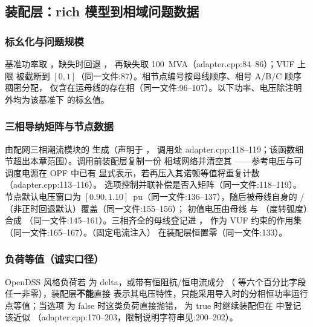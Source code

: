 \subsection{装配层：rich 模型到相域问题数据}\label{subsec:tp-adapter}

\subsubsection*{标幺化与问题规模}
基准功率取 ，缺失时回退 ，
再缺失取 100~MVA（adapter.cpp:84--86）；VUF 上限  被截断到
$[0,1]$（同一文件:87）。相节点编号按母线顺序、相号 A/B/C 顺序稠密分配，
仅含在运母线的存在相（同一文件:96--107）。以下功率、电压除注明外均为该基准下
的标幺值。

\subsubsection*{三相导纳矩阵与节点数据}
 由配网三相潮流模块的 
生成（声明于 ，
调用处 adapter.cpp:118--119；该函数细节超出本章范围）。调用前装配层复制一份
相域网络并清空其 ——参考电压与可调度电源在 OPF 中已有
显式表示，若再压入其诺顿等值将重复计数（adapter.cpp:113--116）。
 选项控制并联补偿是否入矩阵（同一文件:118--119）。
节点默认电压窗口为 $[0.90,1.10]$~pu（同一文件:136--137），随后被母线自身的
/（非正时回退默认）覆盖（同一文件:155--156）；
初值电压由母线  与 （度转弧度）合成
（同一文件:145--161）。三相齐全的母线登记进 ，
作为 VUF 约束的作用集（同一文件:165--167）。（固定电流注入）
在装配层恒置零（同一文件:133）。

\subsubsection*{负荷等值（诚实口径）}
OpenDSS 风格负荷若  为 delta，或带有恒阻抗/恒电流成分
（ 等六个百分比字段任一非零），装配层\textbf{不能}直接
表示其电压特性，只能采用导入时的分相恒功率运行点等值；当选项
 为 false 时这类负荷直接抛错，
为 true 时继续装配但在  中登记该近似
（adapter.cpp:170--203，限制说明字符串见:200--202）。

